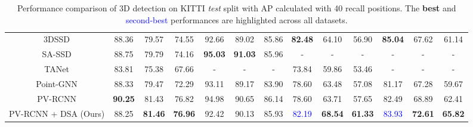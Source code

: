 \documentclass[10pt,twocolumn,letterpaper]{article}
\begin{document}
\begin{table*}[t]
\begin{tabular*}{\textwidth}{c||ccc|ccc|ccc|ccc}
        3DSSD \cite{3D-SSD} & 
        88.36 & 79.57 & 74.55 &
        92.66 & 89.02 & 85.86 &
        \textbf{82.48} & 64.10 & 56.90 & 
        \textbf{85.04} & 67.62 & 61.14 \\
        
        SA-SSD \cite{sa-ssd} & 
        88.75 & 79.79 & 74.16 &
        \textbf{95.03} & \bf{91.03} & 85.96 &
        - & - & - & - & - & - \\
        
        TANet \cite{tanet} & 
        83.81 & 75.38 & 67.66 &
        - & - & - &
        73.84 & 59.86 & 53.46 &
        - & - & - \\
        
        Point-GNN \cite{pointgnn} &
        88.33 & 79.47 & 72.29 &
        93.11 & 89.17 & 83.90 &
        78.60 & 63.48 & 57.08 &
        81.17 & 67.28 & 59.67 \\
        
        PV-RCNN \cite{PVRCNN} & 
        \textbf{90.25} & 81.43 & 76.82 &
        94.98 & 90.65 & 86.14 &
        78.60 & 63.71 & 57.65 &
        82.49 & 68.89 & 62.41 \\
        
        
        \hline
PV-RCNN + DSA (Ours) & 
        88.25 & \textbf{81.46} & \textbf{76.96} &
        92.42 & 90.13 & 85.93 &
        \textcolor{blue}{82.19} & \textbf{68.54} & \textbf{61.33} &
        \textcolor{blue}{83.93} & \textbf{72.61} & \textbf{65.82} \\
        


\hline
    \end{tabular*}
    \caption{Performance comparison of 3D detection on KITTI \textit{test} split with AP calculated with 40 recall positions. The \textbf{best} and \textcolor{blue}{second-best} performances are highlighted across all datasets.}
    \label{tab:kitti_test}
\end{table*} \setlength{\tabcolsep}{5.7pt}
\end{document}
